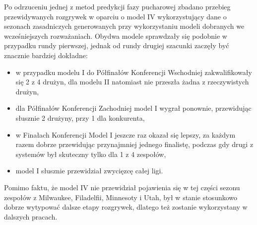 \documentclass[inzynierska]{pwr_wmat_praca_dyplomowa}
\theoremstyle{plain}
\numberwithin{theorem}{chapter}
\theoremstyle{definition}
\numberwithin{theorem}{chapter}
\begin{document}
Po odrzuceniu jednej z metod predykcji fazy pucharowej zbadano przebieg przewidywanych rozgrywek w oparciu o model IV wykorzystujący dane o sezonach zasadniczych generowanych przy wykorzystaniu modeli dobranych we wcześniejszych rozważaniach. Obydwa modele sprawdzały się podobnie w przypadku rundy pierwszej, jednak od rundy drugiej szacunki zaczęły być znacznie bardziej dokładne:
\begin{itemize}
	\item w przypadku modelu I do Półfinałów Konferencji Wschodniej zakwalifikowały się 2 z 4 drużyn, dla modelu II natomiast nie przeszła żadna z rzeczywistych drużyn,
	\item dla Półfinałów Konferencji Zachodniej model I wygrał ponownie,  przewidując słusznie 2 drużyny, przy 1 dla konkurenta,
	\item w Finałach Konferencji Model I jeszcze raz okazał się lepszy, za każdym razem dobrze przewidując przynajmniej jednego finalistę, podczas gdy drugi z systemów był skuteczny tylko dla 1 z 4 zespołów,
	\item model I słusznie przewidział zwycięzcę całej ligi.
\end{itemize}
Pomimo faktu, że model IV nie przewidział pojawienia się w tej części sezonu zespołów z Milwaukee, Filadelfii, Minnesoty i Utah, był w stanie stosunkowo dobrze wytypować dalsze etapy rozgrywek, dlatego też zostanie wykorzystany w dalszych pracach.
\end{document}
